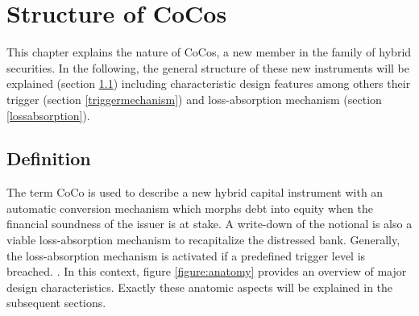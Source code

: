 \chapter{Structure of CoCos}

This chapter explains the nature of CoCos, a new member in the family of hybrid securities. In the following, the general structure of these new instruments will be explained (section \ref{definitioncocos}) including characteristic design features among others their trigger (section \ref{triggermechanism}) and loss-absorption mechanism (section \ref{lossabsorption}).

\section{Definition}\label{definitioncocos}

The term CoCo is used to describe a new hybrid capital instrument with an automatic conversion mechanism which morphs debt into equity when the financial soundness of the issuer is at stake. A write-down of the notional is also a viable loss-absorption mechanism to recapitalize the distressed bank. Generally, the loss-absorption mechanism is activated if a predefined trigger level is breached. \citep{de2011pricing, zahres2011contingent}. In this context, figure \ref{figure:anatomy} provides an overview of major design characteristics. Exactly  these anatomic aspects will be explained in the subsequent sections.\\

